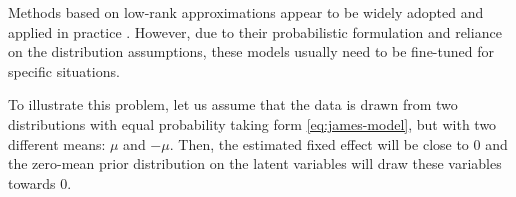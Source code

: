 \documentclass[preprint]{imsart}
\numberwithin{equation}{section}
\theoremstyle{plain}
\newcommand{\cN}{\mathcal{N}}
\begin{document}
Methods based on low-rank approximations appear to be widely adopted and applied in practice \citep{berkey1983longitudinal, yan2017dynamic, hall2006properties, besse1986principal, yao2006penalized, greven2011longitudinal}. However, due to their probabilistic formulation and reliance on the distribution assumptions, these models usually need to be fine-tuned for specific situations.

To illustrate this problem, let us assume that the data is drawn from two distributions with equal probability taking form \eqref{eq:james-model}, but with two different means: $\mu$ and $-\mu$. Then, the estimated fixed effect will be close to $0$ and the zero-mean prior distribution on the latent variables will draw these variables towards $0$.

\end{document}
